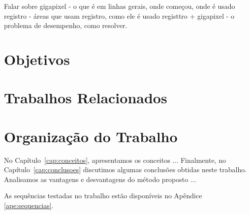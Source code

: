 Falar sobre
gigapixel - o que é em linhas gerais, onde começou, onde é usado
registro - áreas que usam registro, como ele é usado
registtro + gigapixel - o problema de desempenho, como resolver.


\section{Objetivos}
\label{sec:objetivo}

\section{Trabalhos Relacionados}
\label{sec:objetivo}

\section{Organização do Trabalho}
\label{sec:organizacao_trabalho}

No Capítulo~\ref{cap:conceitos}, apresentamos os conceitos ... Finalmente, no
Capítulo~\ref{cap:conclusoes} discutimos algumas conclusões obtidas neste
trabalho. Analisamos as vantagens e desvantagens do método proposto ... 

As sequências testadas no trabalho estão disponíveis no Apêndice \ref{ape:sequencias}.
